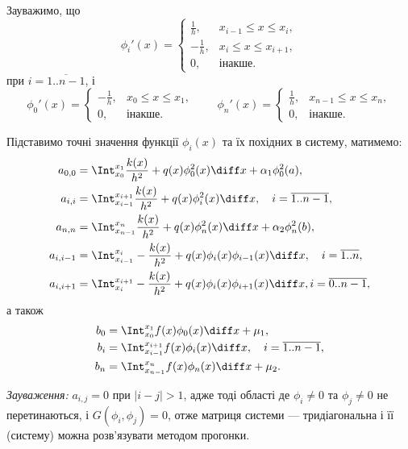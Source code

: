 Зауважимо, що
\begin{equation}
    \phi_i'(x) = \begin{cases}
        \frac{1}{h}, & x_{i - 1} \le x \le x_i, \\
        -\frac{1}{h}, & x_i \le x \le x_{i + 1}, \\
        0, & \text{інакше}.
    \end{cases}
\end{equation}
при $i = \overline{1..n-1}$, і
\begin{equation}
    \phi_0'(x) = \begin{cases}
        -\frac{1}{h}, & x_0 \le x \le x_{1}, \\
        0, & \text{інакше}.
    \end{cases}
    \qquad
    \phi_n'(x) = \begin{cases}
        \frac{1}{h}, & x_{n - 1} \le x \le x_n, \\
        0, & \text{інакше}.
    \end{cases}
\end{equation}

Підставимо точні значення функції $\phi_i(x)$ та їх похідних в систему, матимемо:
\begin{align}
    a_{0, 0} &= \Int_{x_0}^{x_1} \frac{k(x)}{h^2} + q(x) \phi^2_0(x) \diff x + \alpha_1 \phi^2_0(a), \\
    a_{i, i} &= \Int_{x_{i - 1}}^{x_{i + 1}} \frac{k(x)}{h^2} + q(x) \phi^2_i(x) \diff x, \quad i = \overline{1..n-1}, \\
    a_{n, n} &= \Int_{x_{n - 1}}^{x_n} \frac{k(x)}{h^2} + q(x) \phi^2_n(x) \diff x + \alpha_2 \phi^2_n(b), \\
    a_{i, i - 1} &= \Int_{x_{i - 1}}^{x_i} -\frac{k(x)}{h^2} + q(x) \phi_i(x) \phi_{i - 1}(x) \diff x, \quad i = \overline{1..n}, \\
    a_{i, i + 1} &= \Int_{x_i}^{x_{i + 1}} -\frac{k(x)}{h^2} + q(x) \phi_i(x) \phi_{i + 1}(x) \diff x, i = \overline{0..n-1},
\end{align}
а також
\begin{align}
    b_0 &= \Int_{x_0}^{x_1} f(x) \phi_0(x) \diff x + \mu_1, \\
    b_i &= \Int_{x_{i - 1}}^{x_{i + 1}} f(x) \phi_i(x) \diff x, \quad i = \overline{1..n-1}, \\
    b_n &= \Int_{x_{n - 1}}^{x_n} f(x) \phi_n(x) \diff x + \mu_2.
\end{align}

\textit{Зауваження:} $a_{i,j} = 0$ при $|i - j| > 1$, адже тоді області де $\phi_i \ne 0$ та $\phi_j \ne 0$ не перетинаються, і $G(\phi_i, \phi_j) = 0$, отже матриця системи --- тридіагональна і її (систему) можна розв'язувати методом прогонки.

